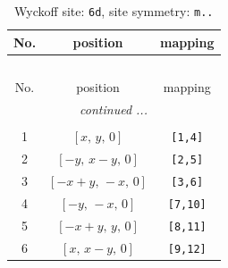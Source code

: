 \documentclass[fleqn,8pt]{jsarticle}
\begin{document}
\renewcommand{\arraystretch}{1.2}
\begin{longtable}{ccc}
\caption{Wyckoff site: {\tt 6d}, site symmetry: {\tt m..}}
 \\
 \hline \hline
No. & position & mapping \\ \hline \endfirsthead

\multicolumn{2}{l}{\tablename\ \thetable{}} \\
 \hline \hline
No. & position & mapping \\ \hline \endhead

 \hline \hline
\multicolumn{2}{r}{\footnotesize\it continued ...} \\ \endfoot

 \hline \hline
\multicolumn{2}{r}{} \\ \endlastfoot

1 & $\left[ x,\, y,\, 0 \right]$ & {\tt [1,4]} \\ \hline
2 & $\left[ - y,\, x - y,\, 0 \right]$ & {\tt [2,5]} \\ \hline
3 & $\left[ - x + y,\, - x,\, 0 \right]$ & {\tt [3,6]} \\ \hline
4 & $\left[ - y,\, - x,\, 0 \right]$ & {\tt [7,10]} \\ \hline
5 & $\left[ - x + y,\, y,\, 0 \right]$ & {\tt [8,11]} \\ \hline
6 & $\left[ x,\, x - y,\, 0 \right]$ & {\tt [9,12]} \\
\end{longtable}
\renewcommand{\arraystretch}{1.2}
\end{document}
